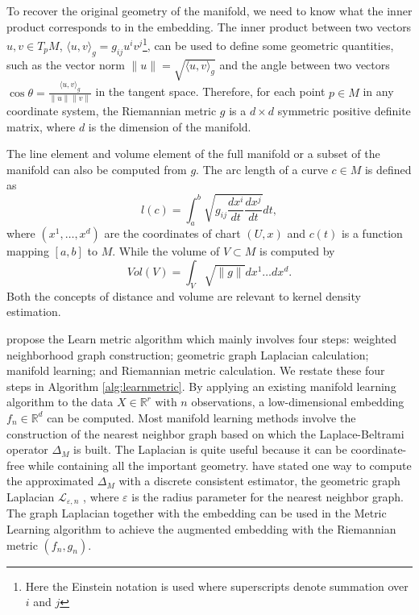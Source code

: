 \documentclass[11pt,a4paper,]{article}
\begin{document}
To recover the original geometry of the manifold, we need to know what the inner product corresponds to in the embedding. The inner product between two vectors \(u,v \in T_pM\), \(\langle u,v \rangle_g=g_{ij}u^iv^j\)\footnote{Here the Einstein notation is used where superscripts denote summation over \(i\) and \(j\)}, can be used to define some geometric quantities, such as the vector norm \(\|u\|=\sqrt{\langle u,v \rangle_g}\) and the angle between two vectors \(\cos{\theta}=\frac{\langle u,v \rangle_g}{\|u\|\|v\|}\) in the tangent space.
Therefore, for each point \(p\in M\) in any coordinate system, the Riemannian metric \(g\) is a \(d\times d\) symmetric positive definite matrix, where \(d\) is the dimension of the manifold.

The line element and volume element of the full manifold or a subset of the manifold can also be computed from \(g\). The arc length of a curve \(c\in M\) is defined as
\[
l(c)=\int_a^b \sqrt{g_{ij} \frac{dx^i}{dt} \frac{dx^j}{dt}} dt,
\]
where \((x^1,\dots,x^d)\) are the coordinates of chart \((U,x)\) and \(c(t)\) is a function mapping \([a,b]\) to \(M\). While the volume of \(V\subset M\) is computed by
\[
Vol(V)=\int_V \sqrt{\|g\|} dx^1\dots dx^d.
\]
Both the concepts of distance and volume are relevant to kernel density estimation.

\textcite{Perrault-Joncas2013-pq} propose the Learn metric algorithm which mainly involves four steps: weighted neighborhood graph construction; geometric graph Laplacian calculation; manifold learning; and Riemannian metric calculation. We restate these four steps in Algorithm \ref{alg:learnmetric}.
By applying an existing manifold learning algorithm to the data \(X\in \mathbb{R}^r\) with \(n\) observations, a low-dimensional embedding \(f_n \in \mathbb{R}^d\) can be computed. Most manifold learning methods involve the construction of the nearest
neighbor graph based on which the Laplace-Beltrami operator \(\Delta_M\) is built. The Laplacian is quite useful because it can be coordinate-free while containing all the important geometry.
\textcite{Perrault-Joncas2013-pq} have stated one way to compute the approximated \(\Delta_M\) with a discrete consistent estimator, the geometric graph Laplacian \(\mathcal{L}_{\varepsilon,n}\) \autocite{Zhou2011-za}, where \(\varepsilon\) is the radius parameter for the nearest neighbor graph.
The graph Laplacian together with the embedding can be used in the Metric Learning algorithm to achieve the augmented embedding with the Riemannian metric \((f_n, g_n)\).
\end{document}
